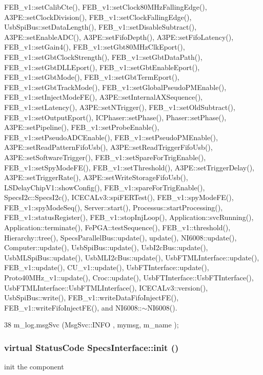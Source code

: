 FEB\_\-v1::setCalibCte(), FEB\_\-v1::setClock80MHzFallingEdge(), A3PE::setClockDivision(), FEB\_\-v1::setClockFallingEdge(), UsbSpiBus::setDataLength(), FEB\_\-v1::setDisableSubtract(), A3PE::setEnableADC(), A3PE::setFifoDepth(), A3PE::setFifoLatency(), FEB\_\-v1::setGain4(), FEB\_\-v1::setGbt80MHzClkEport(), FEB\_\-v1::setGbtClockStrength(), FEB\_\-v1::setGbtDataPath(), FEB\_\-v1::setGbtDLLEport(), FEB\_\-v1::setGbtEnableEport(), FEB\_\-v1::setGbtMode(), FEB\_\-v1::setGbtTermEport(), FEB\_\-v1::setGbtTrackMode(), FEB\_\-v1::setGlobalPseudoPMEnable(), FEB\_\-v1::setInjectModeFE(), A3PE::setInternalAXSequence(), FEB\_\-v1::setLatency(), A3PE::setNTrigger(), FEB\_\-v1::setOldSubtract(), FEB\_\-v1::setOutputEport(), ICPhaser::setPhase(), Phaser::setPhase(), A3PE::setPipeline(), FEB\_\-v1::setProbeEnable(), FEB\_\-v1::setPseudoADCEnable(), FEB\_\-v1::setPseudoPMEnable(), A3PE::setReadPatternFifoUsb(), A3PE::setReadTriggerFifoUsb(), A3PE::setSoftwareTrigger(), FEB\_\-v1::setSpareForTrigEnable(), FEB\_\-v1::setSpyModeFE(), FEB\_\-v1::setThreshold(), A3PE::setTriggerDelay(), A3PE::setTriggerRate(), A3PE::setWriteStorageFifoUsb(), LSDelayChipV1::showConfig(), FEB\_\-v1::spareForTrigEnable(), SpecsI2c::SpecsI2c(), ICECALv3::spiFERTest(), FEB\_\-v1::spyModeFE(), FEB\_\-v1::spyModeSeq(), Server::start(), Processus::startProcessing(), FEB\_\-v1::statusRegister(), FEB\_\-v1::stopInjLoop(), Application::svcRunning(), Application::terminate(), FePGA::testSequence(), FEB\_\-v1::threshold(), Hierarchy::tree(), SpecsParallelBus::update(), update(), NI6008::update(), Computer::update(), UsbSpiBus::update(), UsbI2cBus::update(), UsbMLSpiBus::update(), UsbMLI2cBus::update(), UsbFTMLInterface::update(), FEB\_\-v1::update(), CU\_\-v1::update(), UsbFTInterface::update(), Proto40MHz\_\-v1::update(), Croc::update(), UsbFTInterface::UsbFTInterface(), UsbFTMLInterface::UsbFTMLInterface(), ICECALv3::version(), UsbSpiBus::write(), FEB\_\-v1::writeDataFifoInjectFE(), FEB\_\-v1::writeFifoInjectFE(), and NI6008::$\sim$NI6008().


\begin{DoxyCode}
38 { m_log.msgSvc (MsgSvc::INFO    , mymsg, m_name ); }
\end{DoxyCode}
\hypertarget{classSpecsInterface_a99ec05cbe0d15892afbec6feaf33c89b}{
\subsubsection[{init}]{\setlength{\rightskip}{0pt plus 5cm}virtual {\bf StatusCode} SpecsInterface::init ()}}
\label{classSpecsInterface_a99ec05cbe0d15892afbec6feaf33c89b}
init the component

